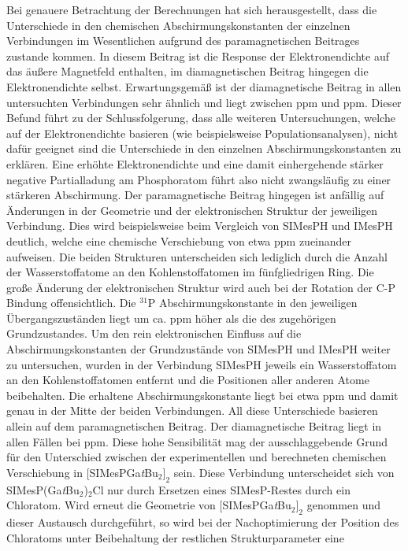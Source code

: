 Bei genauere Betrachtung der Berechnungen hat sich herausgestellt, dass die Unterschiede in den chemischen Abschirmungskonstanten der einzelnen Verbindungen im Wesentlichen aufgrund des paramagnetischen Beitrages zustande kommen. In diesem Beitrag ist die Response der Elektronendichte auf das äußere Magnetfeld enthalten, im diamagnetischen Beitrag hingegen die Elektronendichte selbst. Erwartungsgemäß ist der diamagnetische Beitrag in allen untersuchten Verbindungen sehr ähnlich und liegt zwischen \unit[960]{ppm} und \unit[967]{ppm}. Dieser Befund führt zu der Schlussfolgerung, dass alle weiteren Untersuchungen, welche auf der Elektronendichte basieren (wie beispielsweise Populationsanalysen), nicht dafür geeignet sind die Unterschiede in den einzelnen Abschirmungskonstanten zu erklären. Eine erhöhte Elektronendichte und eine damit einhergehende stärker negative Partialladung am Phosphoratom führt also nicht zwangsläufig zu einer stärkeren Abschirmung. Der paramagnetische Beitrag hingegen ist anfällig auf Änderungen in der Geometrie und der elektronischen Struktur der jeweiligen Verbindung. Dies wird beispielsweise beim Vergleich von SIMesPH und IMesPH deutlich, welche eine chemische Verschiebung von etwa \unit[20]{ppm} zueinander aufweisen. Die beiden Strukturen unterscheiden sich lediglich durch die Anzahl der Wasserstoffatome an den Kohlenstoffatomen im fünfgliedrigen Ring. Die große Änderung der elektronischen Struktur wird auch bei der Rotation der C-P Bindung offensichtlich. Die $^{31}$P Abschirmungskonstante in den jeweiligen Übergangszuständen liegt um ca. \unit[60]{ppm} höher als die des zugehörigen Grundzustandes. Um den rein elektronischen Einfluss auf die Abschirmungskonstanten der Grundzustände von SIMesPH und IMesPH weiter zu untersuchen, wurden in der Verbindung SIMesPH jeweils ein Wasserstoffatom an den Kohlenstoffatomen entfernt und die Positionen aller anderen Atome beibehalten. Die erhaltene Abschirmungskonstante liegt bei etwa \unit[444]{ppm} und damit genau in der Mitte der beiden Verbindungen. All diese Unterschiede basieren allein auf dem paramagnetischen Beitrag. Der diamagnetische Beitrag liegt in allen Fällen bei \unit[962]{ppm}.
Diese hohe Sensibilität mag der ausschlaggebende Grund für den Unterschied zwischen der experimentellen und berechneten chemischen Verschiebung in $[$SIMesPGa\textit{t}Bu$_2]_2$ sein. Diese Verbindung unterscheidet sich von SIMesP(Ga\textit{t}Bu$_2$)$_2$Cl nur durch Ersetzen eines SIMesP-Restes durch ein Chloratom. Wird erneut die Geometrie von $[$SIMesPGa\textit{t}Bu$_2]_2$ genommen und dieser Austausch durchgeführt, so wird bei der Nachoptimierung der Position des Chloratoms unter Beibehaltung der restlichen Strukturparameter eine 
